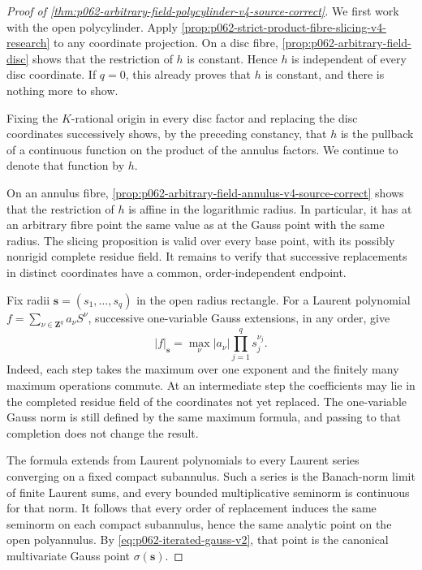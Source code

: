 \begin{proof}[Proof of \cref{thm:p062-arbitrary-field-polycylinder-v4-source-correct}]
We first work with the open polycylinder. Apply
\cref{prop:p062-strict-product-fibre-slicing-v4-research} to any coordinate
projection. On a disc fibre, \cref{prop:p062-arbitrary-field-disc} shows
that the restriction of \(h\) is constant. Hence \(h\) is independent of
every disc coordinate.
If \(q=0\), this already proves that \(h\) is constant, and there is
nothing more to show.

Fixing the \(K\)-rational origin in every disc factor and replacing the
disc coordinates successively shows, by the preceding constancy, that
\(h\) is the pullback of a continuous function on the product of the
annulus factors. We continue to denote that function by \(h\).

On an annulus fibre, \cref{prop:p062-arbitrary-field-annulus-v4-source-correct}
shows that the restriction of \(h\) is affine in the logarithmic radius.
In particular, it has at an arbitrary fibre point the same value as at the
Gauss point with the same radius. The slicing proposition is valid over
every base point, with its possibly nonrigid complete residue field. It
remains to verify that successive replacements in distinct coordinates
have a common, order-independent endpoint.

Fix radii \(\mathbf s=(s_1,\ldots,s_q)\) in the open radius rectangle. For
a Laurent polynomial
\(
 f=\sum_{\nu\in\mathbf Z^q}a_\nu S^\nu
\), successive one-variable Gauss extensions, in any order, give
\begin{equation}\label{eq:p062-iterated-gauss-v2}
                  |f|_{\mathbf s}
                   =\max_{\nu}|a_\nu|
                         \prod_{j=1}^q s_j^{\nu_j}.
\end{equation}
Indeed, each step takes the maximum over one exponent and the finitely
many maximum operations commute. At an intermediate step the coefficients
may lie in the completed residue field of the coordinates not yet
replaced. The one-variable Gauss norm is still defined by the same maximum
formula, and passing to that completion does not change the result.

The formula extends from Laurent polynomials to every Laurent series
converging on a fixed compact subannulus. Such a series is the Banach-norm
limit of finite Laurent sums, and every bounded multiplicative seminorm is
continuous for that norm. It follows that every order of replacement
induces the same seminorm on each compact subannulus, hence the same
analytic point on the open polyannulus. By
\eqref{eq:p062-iterated-gauss-v2}, that point is the canonical
multivariate Gauss point \(\sigma(\mathbf s)\).


\end{proof}
